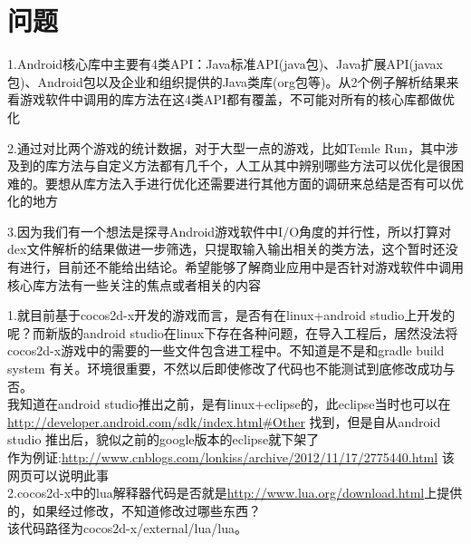 \section{问题}

1.Android核心库中主要有4类API：Java标准API(java包)、Java扩展API(javax包)、Android包以及企业和组织提供的Java类库(org包等)。从2个例子解析结果来看游戏软件中调用的库方法在这4类API都有覆盖，不可能对所有的核心库都做优化

2.通过对比两个游戏的统计数据，对于大型一点的游戏，比如Temle Run，其中涉及到的库方法与自定义方法都有几千个，人工从其中辨别哪些方法可以优化是很困难的。要想从库方法入手进行优化还需要进行其他方面的调研来总结是否有可以优化的地方

3.因为我们有一个想法是探寻Android游戏软件中I/O角度的并行性，所以打算对dex文件解析的结果做进一步筛选，只提取输入输出相关的类方法，这个暂时还没有进行，目前还不能给出结论。希望能够了解商业应用中是否针对游戏软件中调用核心库方法有一些关注的焦点或者相关的内容


1.就目前基于cocos2d-x开发的游戏而言，是否有在linux+android studio上开发的呢？而新版的android studio在linux下存在各种问题，在导入工程后，居然没法将cocos2d-x游戏中的需要的一些文件包含进工程中。不知道是不是和gradle build system 有关。环境很重要，不然以后即使修改了代码也不能测试到底修改成功与否。\\
    我知道在android studio推出之前，是有linux+eclipse的，此eclipse当时也可以在\url{http://developer.android.com/sdk/index.html#Other} 找到，但是自从android studio 推出后，貌似之前的google版本的eclipse就下架了\\
作为例证:\url{http://www.cnblogs.com/lonkiss/archive/2012/11/17/2775440.html} 该网页可以说明此事\\
2.cocos2d-x中的lua解释器代码是否就是\url{http://www.lua.org/download.html}上提供的，如果经过修改，不知道修改过哪些东西？\\
该代码路径为cocos2d-x/external/lua/lua。

